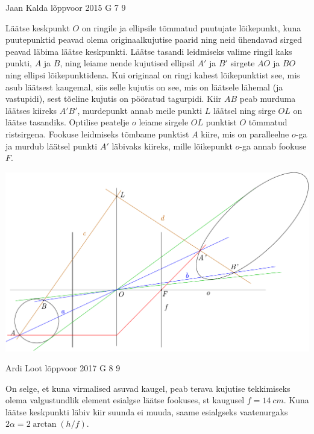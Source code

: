 \documentclass[11pt]{article}
\begin{document}
{%
{Jaan Kalda} %
{lõppvoor} %
{2015} %
{G 7} %
{9} %
{

\ifSolution
Läätse keskpunkt $O$ on ringile ja ellipsile tõmmatud puutujate lõikepunkt, kuna puutepunktid peavad olema originaalkujutise paarid ning neid ühendavad sirged peavad läbima läätse keskpunkti. Läätse tasandi leidmiseks valime ringil kaks punkti, $A$ ja $B$, ning leiame nende kujutised ellipsil $A'$ ja $B'$ sirgete $AO$ ja $BO$ ning ellipsi lõikepunktidena. Kui originaal on ringi kahest lõikepunktist see, mis asub läätsest kaugemal, siis selle kujutis on see, mis on läätsele lähemal (ja vastupidi), sest tõeline kujutis on pööratud tagurpidi. Kiir $AB$ peab murduma läätses kiireks $A'B'$, murdepunkt annab meile punkti $L$ läätsel ning sirge $OL$ on läätse tasandiks. Optilise peatelje $o$ leiame sirgele $OL$ punktist $O$ tõmmatud ristsirgena. Fookuse leidmiseks tõmbame punktist $A$ kiire, mis on paralleelne $o$-ga ja murdub läätsel punkti $A'$ läbivaks kiireks, mille lõikepunkt $o$-ga annab fookuse $F$.

\begin{center}
\includegraphics[width=\textwidth]{2015-v3g-07-ellips_lah}
\end{center}
\fi
}

{Ardi Loot} %
{lõppvoor} %
{2017} %
{G 8} %
{9} %
{

\ifSolution
On selge, et kuna virmalised asuvad kaugel, peab terava kujutise
tekkimiseks olema valgustundlik element esialgse läätse fookuses,
st kaugusel $f=\SI{14}{cm}.$ Kuna läätse keskpunkti läbiv kiir suunda
ei muuda, saame esialgseks vaatenurgaks $2\alpha=2\arctan\left(h/f\right).$

}}
\end{document}
